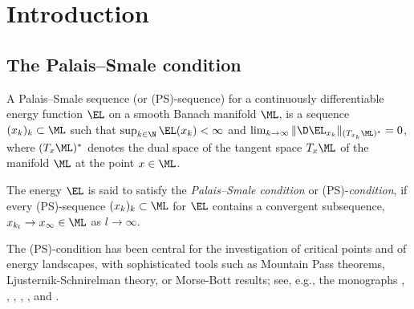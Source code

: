 \section{Introduction}\label{sec:intro}

\subsection{The Palais--Smale condition}\label{sec:palais-smale-cond}
A Palais--Smale sequence (or (PS)-sequence) for a continuously differentiable
energy function $\EL$ on a smooth Banach manifold $\ML$, is a sequence
$(x_k)_k\subset\ML$ such that $\sup_{k\in\N}\EL(x_k)<\infty$ and
$\lim_{k\to\infty}\|\D \EL_{x_k}\|_{(T_{x_k}\ML)^*}=0$, where 
$(T_x\ML)^*$ denotes the dual space of the tangent space $T_x\ML$ of 
the manifold $\ML$ at the point $x\in\ML$.

The energy $\EL$ is said to satisfy the \emph{Palais--Smale condition}
or (PS)-\emph{condition}, if every (PS)-sequence $(x_k)_k\subset\ML$
for $\EL$ contains a convergent subsequence, $x_{k_l}\to x_\infty\in\ML$
as $l\to\infty$.

The (PS)-condition has been central for the investigation of critical
points and of energy landscapes, with sophisticated tools such as
Mountain Pass theorems, 
Ljusternik-Schnirelman theory, or Morse-Bott results; 
see, e.g., the monographs \cite{rabinowitz_1986}, \cite{palais-terng_1988},
\cite{mawhin-willem_1989}, \cite{WillemMinimaxTheorems1996a},
\cite[Chapters II \& III]{struwe_2008a}, and
\cite{jabri_2003}. 

